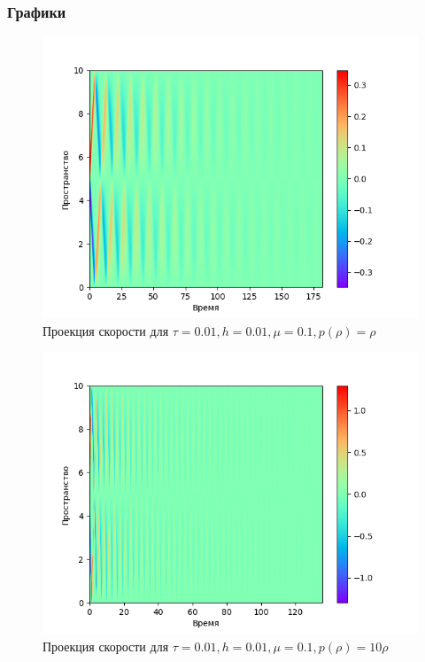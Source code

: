\subsubsection{Графики}
\begin{center}
\begin{figure}[H]
    \centering
    \includegraphics[height=0.4\textheight]{pics/task2/u-2-2-11_1.png}
    \caption{Проекция скорости для $\tau = 0.01, h = 0.01, \mu = 0.1, p(\rho) = \rho$}
\end{figure}

\begin{figure}[H]
    \centering
    \includegraphics[height=0.4\textheight]{pics/task2/u-2-2-12_1.png}
    \caption{Проекция скорости для $\tau = 0.01, h = 0.01, \mu = 0.1, p(\rho) = 10\rho$}
\end{figure}


\end{center}
